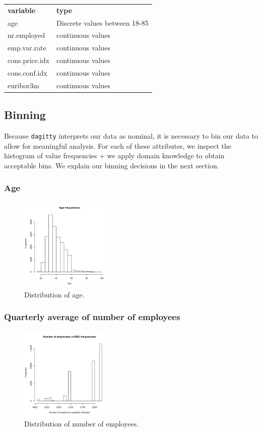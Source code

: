 \documentclass[11pt]{article}
\begin{document}
\begin{multicols}{2}
    \begin{tabular}{ll}
        \textbf{variable} & \textbf{type} \\
        age & Discrete values between 18-85 \\
        nr.employed & continuous values \\
        emp.var.rate & continuous values \\
        cons.price.idx & continuous values \\
        cons.conf.idx & continuous values \\
        euribor3m & continuous values \\
    \end{tabular}

\subsection{Binning}
Because \texttt{dagitty} interprets our data as nominal, it is necessary to bin
our data to allow for meaningful analysis. For each of these attributes, we
inspect the histogram of value frequencies + we apply domain knowledge to obtain
acceptable bins. We explain our binning decisions in the next section.

\subsubsection{Age}
\begin{figure}[H]
	\centering
	\includegraphics[width=0.4\textwidth]{images/age}
	\caption{Distribution of age.}
	\label{fig:age}
\end{figure}

\subsubsection{Quarterly average of number of employees}
\begin{figure}[H]
	\centering
	\includegraphics[width=0.4\textwidth]{images/nr_employed}
	\caption{Distribution of number of employees.}
	\label{fig:nr_employed}
\end{figure}


\end{multicols}
\end{document}
